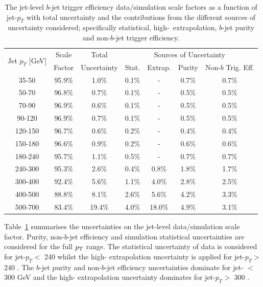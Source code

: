 \begin{table}[!ht]
  \vspace{-1em}
  \begin{tabular}{|c||c|c||c|c|c|c|}
    \hline
    \multirow{2}{*}{Jet $p_T$ [GeV]} & Scale  & Total       & \multicolumn{4}{c|}{Sources of Uncertainty} \\ \cline{4-7} 
                                     & Factor & Uncertainty & Stat.  & Extrap.  & Purity  & Non-$b$ Trig. Eff. \\
    \hline
    35-50   & 95.9\% & 1.0\% & 0.1\% & - & 0.7\% & 0.7\% \\
    50-70   & 96.8\% & 0.7\% & 0.1\% & - & 0.5\% & 0.5\% \\
    70-90   & 96.9\% & 0.6\% & 0.1\% & - & 0.5\% & 0.5\% \\
    90-120  & 96.9\% & 0.7\% & 0.1\% & - & 0.5\% & 0.5\% \\
    120-150 & 96.7\% & 0.6\% & 0.2\% & - & 0.4\% & 0.4\% \\
    150-180 & 96.6\% & 0.9\% & 0.2\% & - & 0.6\% & 0.6\% \\
    180-240 & 95.7\% & 1.1\% & 0.5\% & - & 0.7\% & 0.7\% \\
    \hline
    240-300 & 95.3\% & 2.6\% & 0.4\% & 0.8\% & 1.8\% & 1.7\% \\
    300-400 & 92.4\% & 5.6\% & 1.1\% & 4.0\% & 2.8\% & 2.5\% \\
    400-500 & 88.8\% & 8.1\% & 2.6\% & 5.6\% & 4.2\% & 3.3\% \\
    500-700 & 83.4\% & 19.4\% & 4.0\% & 18.0\% & 4.9\% & 3.1\% \\
    \hline
\end{tabular}
  \caption[The jet-level $b$-jet trigger efficiency data/simulation scale factors as a function of jet-$p_{T}$ with total uncertainty
    and the contributions from the different sources of uncertainty considered.]
          {The jet-level $b$-jet trigger efficiency data/simulation scale factors as a function of jet-$p_{T}$
    with total uncertainty and the contributions from the different sources of uncertainty considered;
    specifically statistical, high-\pT~extrapolation, $b$-jet purity and non-$b$-jet trigger efficiency.}
\label{tab:bTrig_jetSys}
\end{table}


Table~\ref{tab:bTrig_jetSys} summarises the uncertainties on the jet-level data/simulation scale factor.
Purity, non-$b$-jet efficiency and simulation statistical uncertainties are considered for the full $p_{\mathrm{T}}$ range.
The statistical uncertainty of data is considered for jet-$p_T <$ 240 \GeV{}
whilst the high-\pT{} extrapolation uncertainty is applied for jet-$p_T >$ 240 \GeV.
The $b$-jet purity and non-$b$-jet efficiency uncertainties dominate for jet-\pT{} $<$ 300 GeV and the high-\pT{} extrapolation uncertainty dominates for jet-$p_T >$ 300 \GeV.

